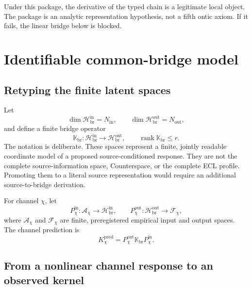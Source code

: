 \documentclass[11pt]{article}
\begin{document}
Under this package, the derivative of the typed chain is a legitimate local object. The package is an analytic representation hypothesis, not a fifth ontic axiom. If it fails, the linear bridge below is blocked.


\section{Identifiable common-bridge model}
\label{sec:identifiable_model}

\subsection{Retyping the finite latent spaces}

Let
\begin{equation}
\dim\mathcal H_{\mathrm{br}}^{\mathrm{in}}=N_{\mathrm{in}},
\qquad
\dim\mathcal H_{\mathrm{br}}^{\mathrm{out}}=N_{\mathrm{out}},
\end{equation}
and define a finite bridge operator
\begin{equation}
\mathbb K_{\mathrm{br}}:
\mathcal H_{\mathrm{br}}^{\mathrm{in}}
\longrightarrow
\mathcal H_{\mathrm{br}}^{\mathrm{out}},
\qquad
\operatorname{rank}\mathbb K_{\mathrm{br}}\le r.
\label{eq:bridge_operator}
\end{equation}
The notation is deliberate. These spaces represent a finite, jointly readable coordinate model of a proposed source-conditioned response. They are not the complete source-information space, Counterspace, or the complete ECL profile. Promoting them to a literal source representation would require an additional source-to-bridge derivation.

For channel \(\chi\), let
\begin{equation}
P_{\chi}^{\mathrm{in}}:\mathcal A_{\chi}\longrightarrow
\mathcal H_{\mathrm{br}}^{\mathrm{in}},
\qquad
P_{\chi}^{\mathrm{out}}:\mathcal H_{\mathrm{br}}^{\mathrm{out}}
\longrightarrow\mathcal F_{\chi},
\label{eq:channel_maps}
\end{equation}
where \(\mathcal A_{\chi}\) and \(\mathcal F_{\chi}\) are finite, preregistered empirical input and output spaces. The channel prediction is
\begin{equation}
K_{\chi}^{\mathrm{pred}}
=P_{\chi}^{\mathrm{out}}
 \mathbb K_{\mathrm{br}}
 P_{\chi}^{\mathrm{in}}.
\label{eq:bridge_factorization}
\end{equation}


\subsection{From a nonlinear channel response to an observed kernel}
\label{sec:linearization}
\end{document}
